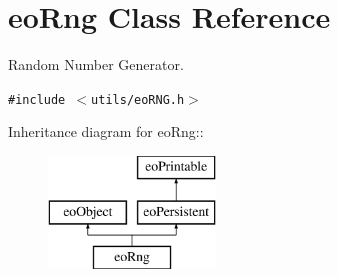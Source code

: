 \section{eo\-Rng Class Reference}
\label{classeo_rng}
Random Number Generator.  


{\tt \#include $<$utils/eo\-RNG.h$>$}

Inheritance diagram for eo\-Rng::\begin{figure}[H]
\begin{center}
\leavevmode
\includegraphics[height=3cm]{classeo_rng}
\end{center}
\end{figure}
